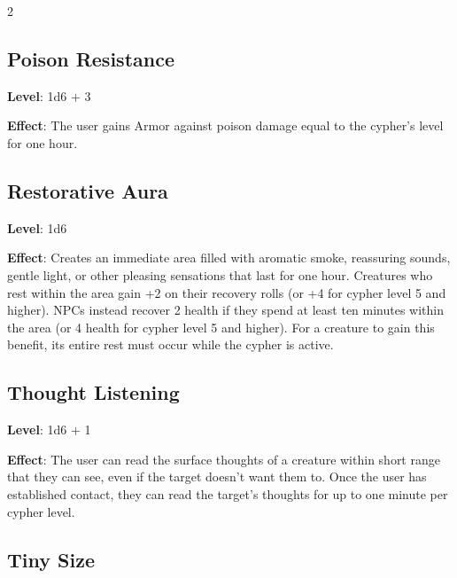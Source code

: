 \begin{multicols}{2}
\subsection{Poison Resistance}

\textbf{Level}: 1d6 + 3 

\textbf{Effect}: The user gains Armor against poison damage equal to the cypher’s level for one hour.

\subsection{Restorative Aura}

\textbf{Level}: 1d6 

\textbf{Effect}: Creates an immediate area filled with aromatic smoke, reassuring sounds, gentle light, or other pleasing sensations that last for one hour. Creatures who rest within the area gain +2 on their recovery rolls (or +4 for cypher level 5 and higher). NPCs instead recover 2 health if they spend at least ten minutes within the area (or 4 health for cypher level 5 and higher). For a creature to gain this benefit, its entire rest must occur while the cypher is active. 

\subsection{Thought Listening}

\textbf{Level}: 1d6 + 1 

\textbf{Effect}: The user can read the surface thoughts of a creature within short range that they can see, even if the target doesn’t want them to. Once the user has established contact, they can read the target’s thoughts for up to one minute per cypher level.

\subsection{Tiny Size}


\end{multicols}
